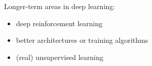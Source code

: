 \begin{frame}[fragile] \frametitle{}

Longer-term areas in deep learning:
\begin{itemize}
\item deep reinforcement learning
\item better architectures or training algorithms
\item (real) unsupervised learning
\end{itemize}

\end{frame}

%
%


%
%
%
%
